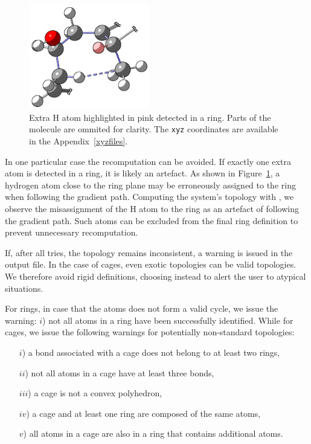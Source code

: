 \begin{figure}%
  \centering
  \vspace*{-0.5cm}%
  \includegraphics[width=0.47\textwidth]{img/extra_atom.png}
  \caption{Extra H atom highlighted in pink detected in a ring. Parts
    of the molecule are
    ommited for clarity. The \texttt{xyz} coordinates
    are available in the Appendix~\ref{xyzfiles}.}
  \label{extra_atom}
\end{figure}

\vspace*{0.1cm}%
In one particular case the recomputation can be avoided. If exactly one extra
atom is detected in a ring, it is likely an artefact. As shown in
Figure~\ref{extra_atom}, a hydrogen atom close to the ring plane may be
erroneously assigned to the ring when following the gradient path. Computing
the system's topology with \aimall, we observe the misassignment of the H atom
to the ring as an artefact of following the gradient path. Such atoms can be
excluded from the final ring definition to prevent unnecessary recomputation.

\vspace*{0.8cm}%
If, after all tries, the topology remains inconsistent, a warning is issued in
the output file. In the case of cages, even exotic topologies can be valid
topologies. We therefore avoid rigid definitions, choosing instead to alert the
user to atypical situations.

For rings, in case that the atoms does not form a valid cycle, we issue the
warning:
$i$) not all atoms in a ring have been successfully identified.
%
While for cages, we issue the following warnings for potentially non-standard
topologies:
%
\begin{itemize}[itemsep=0.0em]
  \item[$i$)] a bond associated with a cage does not belong to at least two rings,
  \item[$ii$)] not all atoms in a cage have at least three bonds,
  \item[$iii$)] a cage is not a convex polyhedron,
  \item[$iv$)] a cage and at least one ring are composed of the same atoms,
  \item[$v$)] all atoms in a cage are also in a ring that contains additional atoms.
\end{itemize}

